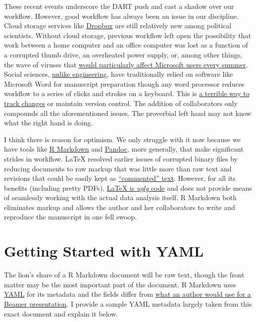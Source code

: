 \documentclass[11pt,]{article}
\begin{document}
These recent events underscore the DART push and cast a shadow over our
workflow. However, good workflow has always been an issue in our
discipline. Cloud storage services like
\href{http://www.dropbox.com}{Dropbox} are still relatively new among
political scientists. Without cloud storage, previous workflow left open
the possibility that work between a home computer and an office computer
was lost as a function of a corrupted thumb drive, an overheated power
supply, or, among other things, the wave of viruses that
\href{http://money.cnn.com/2003/11/05/technology/microsoftbounty/}{would
particularly affect Microsoft users every summer}. Social sciences,
\href{http://kieranhealy.org/blog/archives/2014/01/23/plain-text/}{unlike
engineering}, have traditionally relied on software like Microsoft Word
for manuscript preparation though any word processor reduces workflow to
a series of clicks and strokes on a keyboard. This is
\href{http://www.nytimes.com/2013/04/19/opinion/krugman-the-excel-depression.html}{a
terrible way to track changes} or maintain version control. The addition
of collaborators only compounds all the aforementioned issues. The
proverbial left hand may not know what the right hand is doing.

I think there is reason for optimism. We only struggle with it now
because we have tools like \href{http://rmarkdown.rstudio.com/}{R
Markdown} and \href{http://pandoc.org/}{Pandoc}, more generally, that
make significant strides in workflow. LaTeX resolved earlier issues of
corrupted binary files by reducing documents to raw markup that was
little more than raw text and revisions that could be easily kept as
\href{http://tex.stackexchange.com/questions/11177/how-to-write-hidden-notes-in-a-latex-file}{``commented''
text}. However, for all its benefits (including pretty PDFs),
\href{http://www-rohan.sdsu.edu/~aty/bibliog/latex/gripe.html}{LaTeX is
\emph{ugly} code} and does not provide means of seamlessly working with
the actual data analysis itself. R Markdown both eliminates markup and
allows the author and her collaborators to write and reproduce the
manuscript in one fell swoop.

\hypertarget{getting-started-with-yaml}{%
\section{Getting Started with YAML}\label{getting-started-with-yaml}}

The lion's share of a R Markdown document will be raw text, though the
front matter may be the most important part of the document. R Markdown
uses \href{http://www.yaml.org/}{YAML} for its metadata and the fields
differ from
\href{http://svmiller.com/blog/2015/02/moving-from-beamer-to-r-markdown/}{what
an author would use for a Beamer presentation}. I provide a sample YAML
metadata largely taken from this exact document and explain it below.
\end{document}
